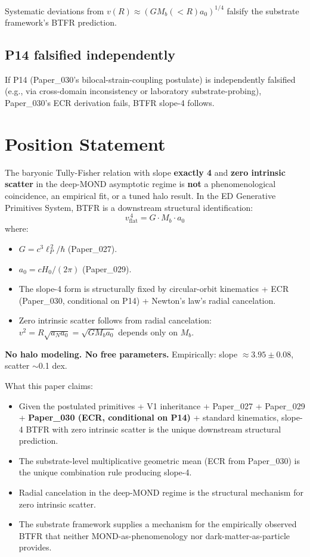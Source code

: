 \documentclass[11pt,a4paper]{article}
\begin{document}
Systematic deviations from $v(R) \approx (GM_b(<R) a_0)^{1/4}$ falsify the substrate framework's BTFR prediction.

\subsection{P14 falsified independently}

If P14 (Paper\_030's bilocal-strain-coupling postulate) is independently falsified (e.g., via cross-domain inconsistency or laboratory substrate-probing), Paper\_030's ECR derivation fails, BTFR slope-4 follows.

\section{Position Statement}

The baryonic Tully-Fisher relation with slope \textbf{exactly 4} and \textbf{zero intrinsic scatter} in the deep-MOND asymptotic regime is \textbf{not} a phenomenological coincidence, an empirical fit, or a tuned halo result. In the ED Generative Primitives System, BTFR is a downstream structural identification:
\[
v_\mathrm{flat}^{\,4} = G \cdot M_b \cdot a_0
\]
where:

\begin{itemize}[noitemsep]
\item $G = c^3 \ell_P^{\,2} / \hbar$ (Paper\_027).
\item $a_0 = cH_0/(2\pi)$ (Paper\_029).
\item The slope-4 form is structurally fixed by circular-orbit kinematics + ECR (Paper\_030, conditional on P14) + Newton's law's radial cancelation.
\item Zero intrinsic scatter follows from radial cancelation: $v^2 = R\sqrt{a_N a_0} = \sqrt{GM_b a_0}$ depends only on $M_b$.
\end{itemize}

\textbf{No halo modeling. No free parameters.} Empirically: slope $\approx 3.95 \pm 0.08$, scatter $\sim$0.1 dex.

What this paper claims:

\begin{itemize}[noitemsep]
\item Given the postulated primitives + V1 inheritance + Paper\_027 + Paper\_029 + \textbf{Paper\_030 (ECR, conditional on P14)} + standard kinematics, slope-4 BTFR with zero intrinsic scatter is the unique downstream structural prediction.
\item The substrate-level multiplicative geometric mean (ECR from Paper\_030) is the unique combination rule producing slope-4.
\item Radial cancelation in the deep-MOND regime is the structural mechanism for zero intrinsic scatter.
\item The substrate framework supplies a mechanism for the empirically observed BTFR that neither MOND-as-phenomenology nor dark-matter-as-particle provides.
\end{itemize}
\end{document}
